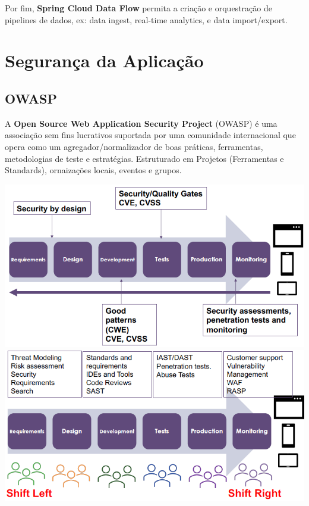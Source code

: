 \documentclass{article}
\begin{document}
\vspace{2mm}

Por fim, \textbf{Spring Cloud Data Flow} permita a criação e
orquestração de pipelines de dados, ex:
data ingest, real-time analytics, e data import/export.\

\pagebreak

\section{Segurança da Aplicação}

\subsection{OWASP}

A \textbf{Open Source Web Application Security Project} (OWASP)
é uma associação sem fins lucrativos suportada por uma
comunidade internacional que opera como um agregador/normalizador
de boas práticas, ferramentas, metodologias de teste e estratégias.
Estruturado em Projetos (Ferramentas e Standards),
ornaizações locais, eventos e grupos.

\begin{center}
  \includegraphics[scale=0.4]{115}
  \includegraphics[scale=0.4]{116}
\end{center}
\end{document}

